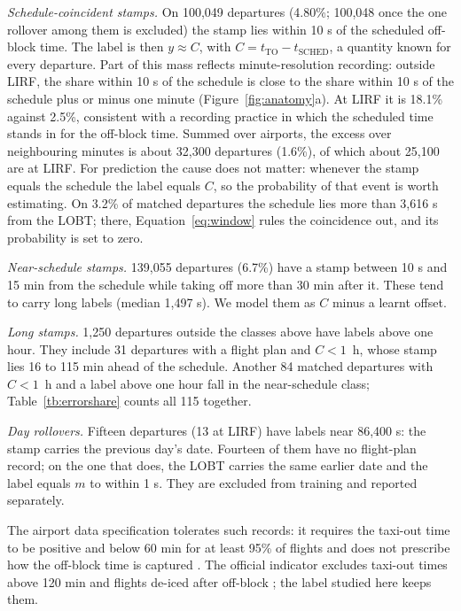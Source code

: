 \documentclass[
  manuscript=article,  %
  layout=preprint,  %
  year=20xx,
  volume=x,
]{extra/joas}
\begin{document}
\textit{Schedule-coincident stamps.} On 100,049 departures (4.80\%; 100,048 once the one rollover among them is excluded) the stamp lies within 10 s of the scheduled off-block time. The label is then $y \approx C$, with $C = t_{\mathrm{TO}} - t_{\mathrm{SCHED}}$, a quantity known for every departure. Part of this mass reflects minute-resolution recording: outside LIRF, the share within 10 s of the schedule is close to the share within 10 s of the schedule plus or minus one minute (Figure~\ref{fig:anatomy}a). At LIRF it is 18.1\% against 2.5\%, consistent with a recording practice in which the scheduled time stands in for the off-block time. Summed over airports, the excess over neighbouring minutes is about 32,300 departures (1.6\%), of which about 25,100 are at LIRF. For prediction the cause does not matter: whenever the stamp equals the schedule the label equals $C$, so the probability of that event is worth estimating. On 3.2\% of matched departures the schedule lies more than 3,616 s from the LOBT; there, Equation~\eqref{eq:window} rules the coincidence out, and its probability is set to zero.

\textit{Near-schedule stamps.} 139,055 departures (6.7\%) have a stamp between 10 s and 15 min from the schedule while taking off more than 30 min after it. These tend to carry long labels (median 1,497 s). We model them as $C$ minus a learnt offset.

\textit{Long stamps.} 1,250 departures outside the classes above have labels above one hour. They include 31 departures with a flight plan and $C < 1$~h, whose stamp lies 16 to 115 min ahead of the schedule. Another 84 matched departures with $C < 1$~h and a label above one hour fall in the near-schedule class; Table~\ref{tb:errorshare} counts all 115 together.

\textit{Day rollovers.} Fifteen departures (13 at LIRF) have labels near 86,400 s: the stamp carries the previous day's date. Fourteen of them have no flight-plan record; on the one that does, the LOBT carries the same earlier date and the label equals $m$ to within 1 s. They are excluded from training and reported separately.

The airport data specification tolerates such records: it requires the taxi-out time to be positive and below 60 min for at least 95\% of flights and does not prescribe how the off-block time is captured \cite{eurocontrol2019specification}. The official indicator excludes taxi-out times above 120 min and flights de-iced after off-block \cite{eurocontrol2023additional}; the label studied here keeps them.
\end{document}
